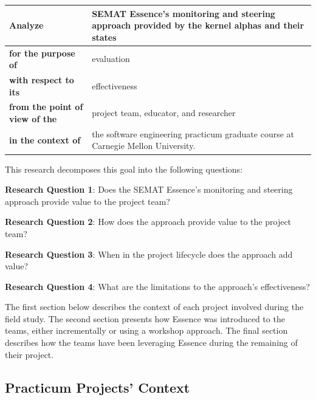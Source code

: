 \begin{table}[h]
\renewcommand{\arraystretch}{1.3}
\centering
\begin{tabular}{|p{1.20in}|p{1.90in}|}
\hline
\textbf{Analyze} & SEMAT Essence's monitoring and steering approach provided by the kernel alphas and their states \\ \hline
\textbf{for the purpose of} & evaluation \\ \hline
\textbf{with respect to its} & effectiveness \\ \hline
\textbf{from the point of view of the} & project team, educator, and researcher \\ \hline
\textbf{in the context of} & the software engineering practicum graduate course at Carnegie Mellon University. \\
\hline
\end{tabular}
\end{table}
 
This research decomposes this goal into the following questions:

\textbf{Research Question 1}: Does the SEMAT Essence's monitoring and steering approach provide value to the project team?

\textbf{Research Question 2}: How does the approach provide value to the project team?

\textbf{Research Question 3}: When in the project lifecycle does the approach add value?

\textbf{Research Question 4}: What are the limitations to the approach's effectiveness?

The first section below describes the context of each project involved during the field study. The second section presents how Essence was introduced to the teams, either incrementally or using a workshop approach. The final section describes how the teams have been leveraging Essence during the remaining of their project.

\subsection{Practicum Projects' Context}


